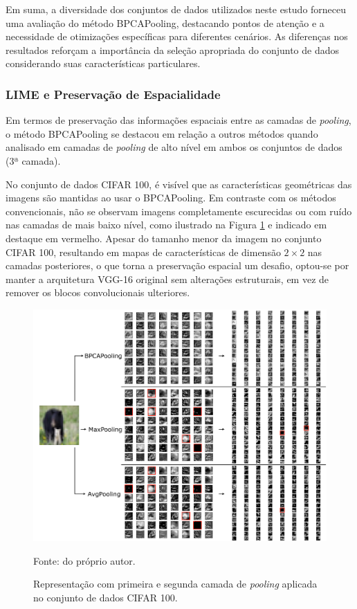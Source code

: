 Em suma, a diversidade dos conjuntos de dados utilizados neste estudo forneceu uma avaliação do método BPCAPooling, destacando pontos de atenção e a necessidade de otimizações específicas para diferentes cenários. As diferenças nos resultados reforçam a importância da seleção apropriada do conjunto de dados considerando suas características particulares.

\subsubsection{LIME e Preservação de Espacialidade}
\label{results:class:lime}
Em termos de preservação das informações espaciais entre as camadas de \textit{pooling}, o método BPCAPooling se destacou em relação a outros métodos quando analisado em camadas de \textit{pooling} de alto nível em ambos os conjuntos de dados (3ª camada).

No conjunto de dados CIFAR 100, é visível que as características geométricas das imagens são mantidas ao usar o BPCAPooling. Em contraste com os métodos convencionais, não se observam imagens completamente escurecidas ou com ruído nas camadas de mais baixo nível, como ilustrado na Figura \ref{results:fig:datasets:5} e indicado em destaque em vermelho. Apesar do tamanho menor da imagem no conjunto CIFAR 100, resultando em mapas de características de dimensão $2 \times 2$ nas camadas posteriores, o que torna a preservação espacial um desafio, optou-se por manter a arquitetura VGG-16 original sem alterações estruturais, em vez de remover os blocos convolucionais ulteriores.

\begin{figure}[H]
    \centering
    \caption{Representação com primeira e segunda camada de \textit{pooling} aplicada no conjunto de dados CIFAR 100.}
    \label{results:fig:datasets:5}
    \includegraphics[width=1\textwidth]{recursos/imagens/results/cifar_blocks.png}

    Fonte: do próprio autor.
\end{figure}

